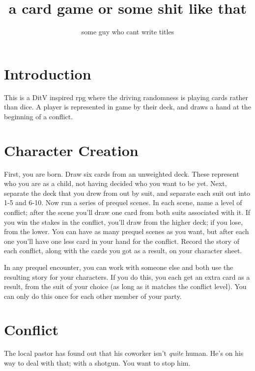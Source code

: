 \documentclass[]{article}
\title{a card game or some shit like that}
\author{some guy who cant write titles}
\date{}
\begin{document}
{\selectfont
\maketitle

\section*{Introduction}
	This is a DitV inspired rpg where the driving randomness is playing cards rather than dice. A player is represented in game by their deck, and draws a hand at the beginning of a conflict.
	
\section*{Character Creation}
	First, you are born. Draw six cards from an unweighted deck. These represent who you are as a child, not having decided who you want to be yet. Next, separate the deck that you drew from out by suit, and separate each suit out into 1-5 and 6-10. Now run a series of prequel scenes. In each scene, name a level of conflict; after the scene you'll draw one card from both suits associated with it. If you win the stakes in the conflict, you'll draw from the higher deck; if you lose, from the lower. You can have as many prequel scenes as you want, but after each one you'll have one less card in your hand for the conflict. Record the story of each conflict, along with the cards you got as a result, on your character sheet. %
	
	In any prequel encounter, you can work with someone else and both use the resulting story for your characters. If you do this, you each get an extra card as a result, from the suit of your choice (as long as it matches the conflict level). You can only do this once for each other member of your party.
\newpage
\section*{Conflict}
	The local pastor has found out that his coworker isn't \textit{quite} human. He's on his way to deal with that; with a shotgun. You want to stop him.
	
}
\end{document}
